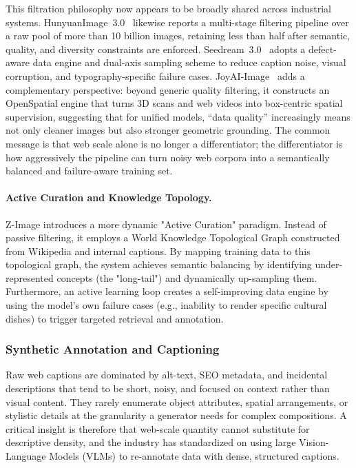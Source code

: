 \documentclass{llmxive}
\begin{document}
This filtration philosophy now appears to be broadly shared across industrial systems. HunyuanImage~3.0~\citep{cao2025hunyuanimage} likewise reports a multi-stage filtering pipeline over a raw pool of more than 10 billion images, retaining less than half after semantic, quality, and diversity constraints are enforced. Seedream~3.0~\citep{gao2025seedream} adopts a defect-aware data engine and dual-axis sampling scheme to reduce caption noise, visual corruption, and typography-specific failure cases. JoyAI-Image~\citep{jdjoyaiimage} adds a complementary perspective: beyond generic quality filtering, it constructs an OpenSpatial engine that turns 3D scans and web videos into box-centric spatial supervision, suggesting that for unified models, ``data quality'' increasingly means not only cleaner images but also stronger geometric grounding. The common message is that web scale alone is no longer a differentiator; the differentiator is how aggressively the pipeline can turn noisy web corpora into a semantically balanced and failure-aware training set.

\paragraph{Active Curation and Knowledge Topology.}
Z-Image introduces a more dynamic "Active Curation" paradigm. Instead of passive filtering, it employs a World Knowledge Topological Graph constructed from Wikipedia and internal captions. By mapping training data to this topological graph, the system achieves semantic balancing by identifying under-represented concepts (the "long-tail") and dynamically up-sampling them. Furthermore, an active learning loop creates a self-improving data engine by using the model's own failure cases (e.g., inability to render specific cultural dishes) to trigger targeted retrieval and annotation.

\subsubsection{Synthetic Annotation and Captioning}
Raw web captions are dominated by alt-text, SEO metadata, and incidental descriptions that tend to be short, noisy, and focused on context rather than visual content. They rarely enumerate object attributes, spatial arrangements, or stylistic details at the granularity a generator needs for complex compositions. A critical insight is therefore that web-scale quantity cannot substitute for descriptive density, and the industry has standardized on using large Vision-Language Models (VLMs) to re-annotate data with dense, structured captions.
\end{document}
